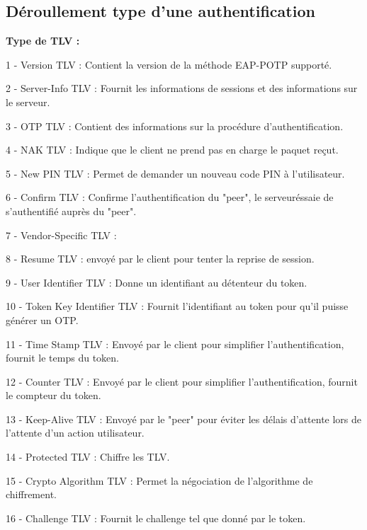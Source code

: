 \documentclass{article}
\begin{document}
\subsection{Déroullement type d'une authentification}

\begin{description}
   \item \textbf{Type de TLV :}
\item   1 - Version TLV : Contient la version de la méthode EAP-POTP supporté.
\item   2 - Server-Info TLV : Fournit les informations de sessions et des informations sur le serveur.
\item   3 - OTP TLV : Contient des informations sur la procédure d'authentification.
\item   4 - NAK TLV : Indique que le client ne prend pas en charge le paquet reçut.
\item   5 - New PIN TLV : Permet de demander un nouveau code PIN à l'utilisateur.
\item   6 - Confirm TLV : Confirme l'authentification du "peer", le serveuréssaie de s'authentifié auprès du "peer".
\item   7 - Vendor-Specific TLV : 
\item   8 - Resume TLV : envoyé par le client pour tenter la reprise de session.
\item   9 - User Identifier TLV : Donne un identifiant au détenteur du token.
\item 10 - Token Key Identifier TLV : Fournit l'identifiant au token pour qu'il puisse générer un OTP.
\item 11 - Time Stamp TLV : Envoyé par le client pour simplifier l'authentification, fournit le temps du token.
\item 12 - Counter TLV : Envoyé par le client pour simplifier l'authentification, fournit le compteur du token.
\item 13 - Keep-Alive TLV : Envoyé par le "peer" pour éviter les délais d'attente lors de l'attente d'un action utilisateur.
\item 14 - Protected TLV : Chiffre les TLV.
\item 15 - Crypto Algorithm TLV : Permet la négociation de l'algorithme de chiffrement.
\item 16 - Challenge TLV : Fournit le challenge tel que donné par le token.
\end{description}
\end{document}
